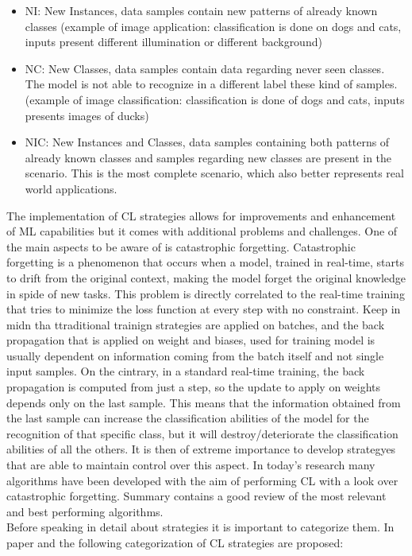 \documentclass[12pt]{report}
\begin{document}
\begin{itemize}
\item NI: New Instances, data samples contain new patterns of already known classes (example of image application: classification is done on dogs and cats, inputs present different illumination or different background)
\item NC: New Classes, data samples contain data regarding never seen classes. The model is not able to recognize in a different label these kind of samples. (example of image classification: classification is done of dogs and cats, inputs presents images of ducks)
\item NIC: New Instances and Classes, data samples containing both patterns of already known classes and samples regarding new classes are present in the scenario. This is the most complete scenario, which also better represents real world applications.
\end{itemize}

The implementation of CL strategies allows for improvements and enhancement of ML capabilities but it comes with additional problems and challenges. One of the main aspects to be aware of is catastrophic forgetting. Catastrophic forgetting \autocite{} is a phenomenon that occurs when a model, trained in real-time, starts to drift from the original context, making the model forget the original knowledge in spide of new tasks. This problem is directly correlated to the real-time training that tries to minimize the loss function at every step with no constraint. Keep in midn tha ttraditional trainign strategies are applied on batches, and the back propagation that is applied on weight and biases, used for training model is usually dependent on information coming from the batch itself and not single input samples. On the cintrary, in a standard real-time training, the back propagation is computed from just a step, so the update to apply on weights depends only on the last sample. This means that the information obtained from the last sample can increase the classification abilities of the model for the recognition of that specific class, but it will destroy/deteriorate the classification abilities of all the others. It is then of extreme importance to develop strategyes that are able to maintain control over this aspect. In today's research many algorithms have been developed with the aim of performing CL with a look over catastrophic forgetting. Summary \autocite{} contains a good review of the most relevant and best performing algorithms. \\
Before speaking in detail about strategies it is important to categorize them. In paper \autocite{} and \autocite{} the following categorization of CL strategies are proposed:
\end{document}
